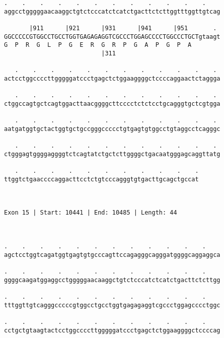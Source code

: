\documentclass{article}
\begin{document}
\begin{Verbatim}
.    .    .    .    .    .    .    .    .    .    .    .    
aggcctgggggaacaaggctgtctcccatctcatctgacttctcttggtttggttgtcag
                                                            
       |911      |921      |931      |941      |951       . 
GGCCCCCGTGGCCTGCCTGGTGAGAGAGGTCGCCCTGGAGCCCCTGGCCCTGCTgtaagt
G  P  R  G  L  P  G  E  R  G  R  P  G  A  P  G  P  A        
                           |311                             
  
   .    .    .    .    .    .    .    .    .    .    .    . 
actcctggccccttgggggatccctgagctctggaaggggctccccaggaactctaggga
                                                            
   .    .    .    .    .    .    .    .    .    .    .    . 
ctggccagtgctcagtggacttaacggggcttcccctctctcctgcagggtgctcgtgga
                                                            
   .    .    .    .    .    .    .    .    .    .    .    . 
aatgatggtgctactggtgctgccgggccccctgtgagtgtggcctgtaggcctcagggc
                                                            
   .    .    .    .    .    .    .    .    .    .    .    . 
ctgggagtggggaggggtctcagtatctgctcttggggctgacaatgggagcaggttatg
                                                            
   .    .    .    .    .    .    .    .    .    .    .
ttggtctgaaccccaggacttcctctgtcccagggtgtgacttgcagctgccat
                                                      
                                                      
 
Exon 15 | Start: 10441 | End: 10485 | Length: 44



.    .    .    .    .    .    .    .    .    .    .    .    
agctcctggtcagatggtgagtgtgcccagttccagagggcagggatggggcaggaggca
                                                            
.    .    .    .    .    .    .    .    .    .    .    .    
ggggcaagatggaggcctgggggaacaaggctgtctcccatctcatctgacttctcttgg
                                                            
.    .    .    .    .    .    .    .    .    .    .    .    
tttggttgtcagggcccccgtggcctgcctggtgagagaggtcgccctggagcccctggc
                                                            
.    .    .    .    .    .    .    .    .    .    .    .    
cctgctgtaagtactcctggccccttgggggatccctgagctctggaaggggctccccag
                                                            

\end{Verbatim}
\end{document}
